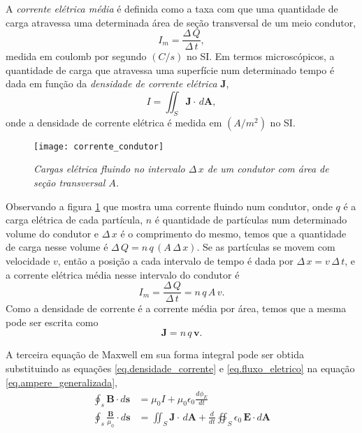 A \textit{corrente elétrica média} é definida como a taxa com que uma quantidade de carga atravessa uma determinada área de seção transversal de um meio condutor,
\begin{equation*}
I_m=\frac{\Delta\,Q}{\Delta\,t},
\end{equation*}
medida em coulomb por segundo $(C/s)$ no SI. Em termos microscópicos, a quantidade de carga que atravessa uma superfície num determinado tempo é dada em função da \textit{densidade de corrente elétrica} $\mathbf{J}$,
\begin{equation}\label{eq.densidade_corrente}
I=\iint_S\mathbf{J}\cdot\,d\mathbf{A},
\end{equation}
onde a densidade de corrente elétrica é medida em $(A/m^2)$ no SI. 
\begin{figure}
\centering
\texttt{[image: corrente\_condutor]}
\caption{\textit{Cargas elétrica fluindo no intervalo $\Delta\,x$ de um condutor com área de seção transversal $A$.}}
\label{fig.corre_condu}
\end{figure}
Observando a figura \ref{fig.corre_condu} que mostra uma corrente fluindo num condutor, onde $q$ é a carga elétrica de cada partícula, $n$ é quantidade de partículas num determinado volume do condutor e $\Delta\,x$ é o comprimento do mesmo, temos que a quantidade de carga nesse volume é $\Delta\,Q=n\,q\,(A\,\Delta\,x)$. Se as partículas se movem com velocidade $v$, então a posição a cada intervalo de tempo é dada por $\Delta\,x=v\,\Delta\,t$, e a corrente elétrica média nesse intervalo do condutor é
\begin{equation*}
I_m=\frac{\Delta\,Q}{\Delta\,t}=n\,q\,A\,v.
\end{equation*}
Como a densidade de corrente é a corrente média por área, temos que a mesma pode ser escrita como 
\begin{equation*}
\mathbf{J}=n\,q\,\mathbf{v}.
\end{equation*}

A terceira equação de Maxwell em sua forma integral pode ser obtida substituindo as equações \ref{eq.densidade_corrente} e \ref{eq.fluxo_eletrico} na equação \ref{eq.ampere_generalizada},
\begin{align*}
\oint_s\mathbf{B}\cdot d\mathbf{s}&=\mu_0I+\mu_0\epsilon_0\frac{d\phi_E}{dt}\\
\oint_s\frac{\mathbf{B}}{\mu_0}\cdot d\mathbf{s}&=\iint_S\mathbf{J}\cdot\,d\mathbf{A}+\frac{d}{dt}\oiint_S\epsilon_0\,\textbf{E}\cdot\textit{d}\textbf{A}
\end{align*}


